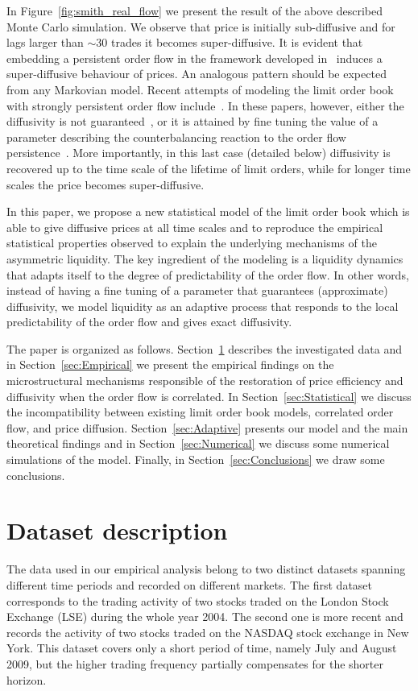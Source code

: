 \documentclass[12pt]{iopart}
\begin{document}
In Figure~\ref{fig:smith_real_flow} we present the result of the above described Monte Carlo simulation. We observe that price is initially sub-diffusive and for lags larger than $\sim 30$ trades it becomes super-diffusive. It is evident that embedding a persistent order flow in the framework developed in~\cite{smith2003statistical} induces a super-diffusive behaviour of prices. An analogous pattern should be expected from any Markovian model. Recent attempts of modeling the limit order book with strongly persistent order flow include~\cite{mike2008empirical,toth2011anomalous,mastromatteo2013agent}. In these papers, however, either the diffusivity is not guaranteed~\cite{mike2008empirical}, or it is attained by fine tuning the value of a parameter describing the counterbalancing reaction to the order flow persistence~\cite{toth2011anomalous}. More importantly, in this last case (detailed below) diffusivity is recovered up to the time scale of the lifetime of limit orders, while for longer time scales the price becomes super-diffusive. 

In this paper, we propose a new statistical model of the limit order book which is able to give diffusive prices at all time scales and to reproduce the empirical statistical properties observed to explain the underlying mechanisms of the asymmetric liquidity. The key ingredient of the modeling is a liquidity dynamics that adapts itself to the degree of predictability of the order flow. In other words, instead of having a fine tuning of a parameter that guarantees (approximate) diffusivity, we model liquidity as an adaptive process that responds to the local predictability of the order flow and gives exact diffusivity.

The paper is organized as follows. Section~\ref{sec:Datasets} describes the investigated data and in Section~\ref{sec:Empirical} we present the empirical findings on the microstructural mechanisms responsible of the restoration of price efficiency and diffusivity when the order flow is correlated. In Section~\ref{sec:Statistical} we discuss the incompatibility between existing limit order book models, correlated order flow, and price diffusion. Section~\ref{sec:Adaptive} presents our model and the main theoretical findings and in Section~\ref{sec:Numerical} we discuss some numerical simulations of the model. Finally, in Section~\ref{sec:Conclusions} we draw some conclusions.

\section{Dataset description}
\label{sec:Datasets}
The data used in our empirical analysis belong to two distinct datasets spanning different time periods and recorded on different markets. The first dataset corresponds to the trading activity of two stocks traded on the London Stock Exchange (LSE) during the whole year 2004. The second one is more recent and records the activity of two stocks traded on the NASDAQ stock exchange in New York. This dataset covers only a short period of time, namely July and August 2009, but the higher trading frequency partially compensates for the shorter horizon.
\end{document}
